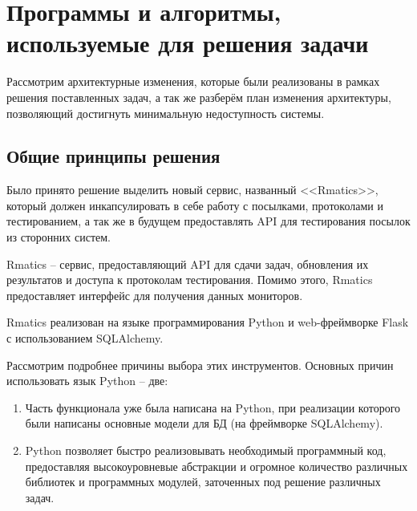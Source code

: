 \chapter{Программы и алгоритмы, используемые для решения задачи}

Рассмотрим архитектурные изменения, которые были реализованы в рамках решения поставленных задач, 
а так же разберём план изменения архитектуры, позволяющий достигнуть минимальную недоступность системы.

\section{Общие принципы решения}

Было принято решение выделить новый сервис, названный <<Rmatics>>, который должен инкапсулировать в себе работу с посылками, протоколами и тестированием, 
а так же в будущем предоставлять API для тестирования посылок из сторонних систем.

Rmatics -- сервис, предоставляющий API для сдачи задач, обновления их результатов и доступа к протоколам тестирования. 
Помимо этого, Rmatics предоставляет интерфейс для получения данных мониторов.

Rmatics реализован на языке программирования Python и web-фреймворке Flask с использованием SQLAlchemy.

Рассмотрим подробнее причины выбора этих инструментов. Основных причин использовать язык Python -- две:

\begin{enumerate}
    \item Часть функционала уже была написана на Python, при реализации которого были написаны основные модели для БД (на фреймворке SQLAlchemy).
    \item Python позволяет быстро реализовывать необходимый программный код, 
предоставляя высокоуровневые абстракции и огромное количество различных библиотек и программных модулей, заточенных под решение различных задач.
\end{enumerate}